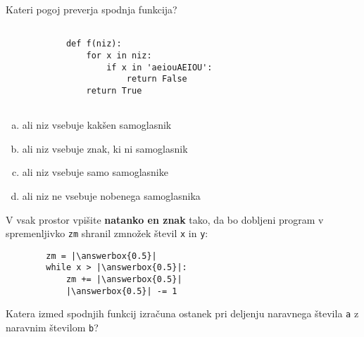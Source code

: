 \documentclass[arhiv, 10pt]{../izpit}
\newcommand{\inlinepy}[1]{\texttt{#1}}
\newcommand{\answerbox}[1]{\framebox{\vphantom{\large M}\hspace{#1cm}}}
\begin{document}
        \naloga*

        \begin{multicols}{2}
        \noindent
        Kateri pogoj preverja spodnja funkcija?
        \begin{verbatim}
        
            def f(niz):
                for x in niz:
                    if x in 'aeiouAEIOU':
                        return False
                return True
            
        \end{verbatim}

        \begin{enumerate}[(a)]
\item ali niz vsebuje kakšen samoglasnik
\item ali niz vsebuje znak, ki ni samoglasnik
\item ali niz vsebuje samo samoglasnike
\item ali niz ne vsebuje nobenega samoglasnika
\end{enumerate}

        \end{multicols}
    
        \naloga*
        \begin{multicols}{2}
        \noindent
        V vsak prostor vpišite \textbf{natanko en znak} tako, da bo dobljeni program v spremenljivko \inlinepy{zm} shranil zmnožek števil \inlinepy{x} in \inlinepy{y}:
        
        \columnbreak
        \begin{verbatim}
        zm = |\answerbox{0.5}|
        while x > |\answerbox{0.5}|:
            zm += |\answerbox{0.5}|
            |\answerbox{0.5}| -= 1
        \end{verbatim}
        \end{multicols}
    
        \clearpage
        \naloga
        
        Katera izmed spodnjih funkcij izračuna ostanek pri deljenju naravnega števila \inlinepy{a} z naravnim številom \inlinepy{b}?
    
\end{document}
